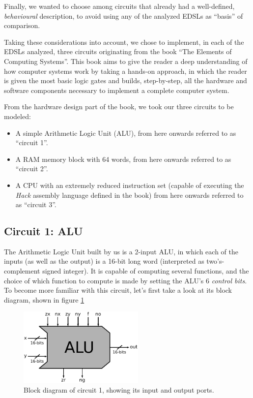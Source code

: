 \documentclass[a4paper]{article}
\begin{document}
        Finally, we wanted to choose among circuits that already had a well-defined,
        \emph{behavioural} description, to avoid using any of the analyzed EDSLs as ``basis'' of
        comparison.

        Taking these considerations into account, we chose to implement, in each of the EDSLs
        analyzed, three circuits originating from the book ``The Elements of Computing
        Systems''\cite{nand2tetris-book}. This book aims to give the reader a deep understanding of
        how computer systems work by taking a hands-on approach, in which the reader is given the
        most basic logic gates and builds, step-by-step, all the hardware and software components
        necessary to implement a complete computer system.

        From the hardware design part of the book, we took our three circuits to be modeled:
        \begin{itemize}
            \item A simple Arithmetic Logic Unit (ALU), from here onwards referred to
                as ``circuit 1''.
            \item A RAM memory block with 64 words, from here onwards referred to as ``circuit 2''.
            \item A CPU with an extremely reduced instruction set (capable of executing the
                \emph{Hack} assembly language defined in the book) from here onwards referred to as
                ``circuit 3''.
        \end{itemize}

        \subsection{Circuit 1: ALU}
        \label{subsec:circuit-alu}
            The Arithmetic Logic Unit built by us is a 2-input ALU, in which each of the inputs (as
            well as the output) is a 16-bit long word (interpreted as two's-complement signed
            integer). It is capable of computing several functions, and the choice of which
            function to compute is made by setting the ALU's 6 \emph{control bits}. To become more
            familiar with this circuit, let's first take a look at its block diagram, shown in
            figure \ref{fig:alu-block}
            \begin{figure}[h!]
                \begin{center}
                    \includegraphics[width=0.55\textwidth]{imgs/alu-block.pdf}
                \end{center}
                \caption{Block diagram of circuit 1, showing its input and output ports.
                    \label{fig:alu-block}}
            \end{figure}
\end{document}
